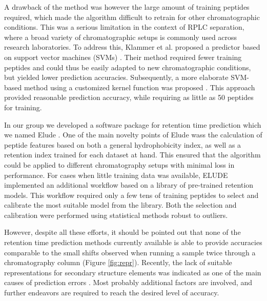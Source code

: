 \documentclass[a4paper]{article}
\begin{document}
A drawback of the method was however the large amount of training
peptides required, which made the algorithm difficult to retrain for
other chromatographic conditions. This was a serious limitation in the
context of RPLC separation, where a broad variety of chromatographic
setups is commonly used across research laboratories. To address this,
Klammer et al. proposed a predictor based on support vector machines
(SVMs) \cite{klammer2007improving}. Their method required fewer
training peptides and could thus be easily adapted to new
chromatographic conditions, but yielded lower prediction
accuracies. Subsequently, a more elaborate SVM-based method using a
customized kernel function was proposed \cite{rtpredict, rtpredictImproved}. This
approach provided reasonable prediction accuracy, while requiring as
little as 50 peptides for training.




In our group we developed a software package for retention time prediction which we named {\sc
Elude} \cite{elude1, elude2}. One of the main novelty
points of {\sc Elude} wass the calculation of peptide features based on
both a general hydrophobicity index, as well as a retention index
trained for each dataset at hand. This ensured that the algorithm
could be applied to different chromatography setups with minimal loss
in performance. For cases when little training data was available,
{\sc ELUDE} implemented an additional workflow based on a library of
pre-trained retention models. This workflow required only a few tens
of training peptides to select and calibrate the most suitable model
from the library. Both the selection and calibration were performed
using statistical methods robust to outliers.



However, despite all these efforts, it should be pointed out that none
of the retention time prediction methods currently available is able
to provide accuracies comparable to the small shifts observed when
running a sample twice through a chromatography column
(Figure \ref{fig:repr}). Recently, the lack of suitable
representations for secondary structure elements was indicated as one
of the main causes of prediction errors \cite{Reimer2012}.  Most
probably additional factors are involved, and further endeavors are
required to reach the desired level of accuracy.
\end{document}
